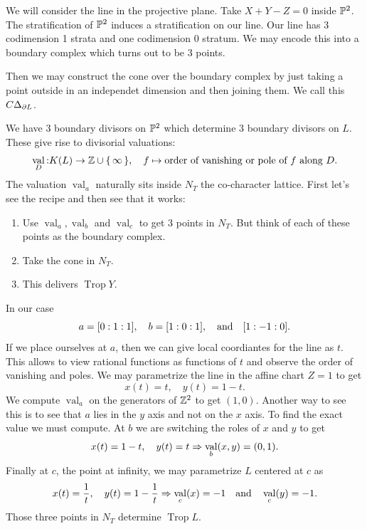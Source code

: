 \documentclass[12pt]{memoir}
\DeclareMathOperator{\val}{val}
\DeclareMathOperator{\Trop}{Trop}
\theoremstyle{definition}
\begin{document}
\begin{Ex}
    We will consider the line in the projective plane. Take $X+Y-Z=0$ inside $\mathbb{P}^2$. The stratification of $\mathbb{P}^2$ induces a stratification on our line. Our line has 3 codimension 1 strata and one codimension 0 stratum. We may encode this into a boundary complex which turns out to be 3 points.\par 
    Then we may construct the cone over the boundary complex by just taking a point outside in an independet dimension and then joining them. We call this $C\Delta_{\partial L}$.\par 
    We have 3 boundary divisors on $\mathbb{P}^2$ which determine 3 boundary divisors on $L$. These give rise to divisorial valuations:
    $$\val_D\: K(L)\to\bZ\cup\set{\infty},\quad f\mapsto\text{order of vanishing or pole of }f\text{ along }D.$$
     The valuation $\val_a$ naturally sits inside $N_T$ the co-character lattice. First let's see the recipe and then see that it works:
    \begin{enumerate}
        \item Use $\val_a,\val_b$ and $\val_c$ to get $3$ points in $N_T$. But think of each of these points as the boundary complex.
        \item Take the cone in $N_T$.
        \item This delivers $\Trop Y$. 
    \end{enumerate}
    In our case 
    $$a=[0:1:1],\quad b=[1:0:1],\quad\text{and}\quad[1:-1:0].$$
    If we place ourselves at $a$, then we can give local coordiantes for the line as $t$. This allows to view rational functions as functions of $t$ and observe the order of vanishing and poles. We may parametrize the line in the affine chart $Z=1$ to get
    $$x(t)=t,\quad y(t)=1-t.$$
    We compute $\val_a$ on the generators of $\mathbb{Z}^2$ to get $(1,0)$. Another way to see this is to see that $a$ lies in the $y$ axis and not on the $x$ axis. To find the exact value we must compute. At $b$ we are switching the roles of $x$ and $y$ to get 
    $$x(t)=1-t,\quad y(t)=t\To \val_b(x,y)=(0,1).$$
    Finally at $c$, the point at infinity, we may parametrize $L$ centered at $c$ as 
    $$x(t)=\frac{1}{t},\quad y(t)=1-\frac1t\To\val_c(x)=-1\word{and}\val_c(y)=-1.$$
    Those three points in $N_T$ determine $\Trop L$. 
\end{Ex}
\end{document}
